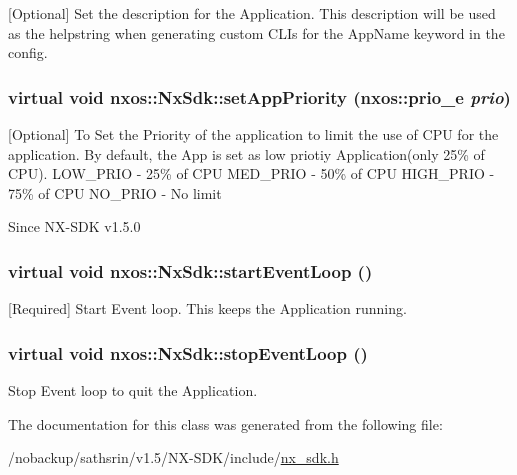 \label{classnxos_1_1NxSdk_a2c6007a383114285951b2d2a062dacec}
\mbox{[}Optional\mbox{]} Set the description for the Application. This description will be used as the helpstring when generating custom CLIs for the AppName keyword in the config. \hypertarget{classnxos_1_1NxSdk_a46d9487216506aa19e5499759f5eaef7}{
\subsubsection[{setAppPriority}]{\setlength{\rightskip}{0pt plus 5cm}virtual void nxos::NxSdk::setAppPriority (nxos::prio\_\-e {\em prio})}}
\label{classnxos_1_1NxSdk_a46d9487216506aa19e5499759f5eaef7}
\mbox{[}Optional\mbox{]} To Set the Priority of the application to limit the use of CPU for the application. By default, the App is set as low priotiy Application(only 25\% of CPU). LOW\_\-PRIO -\/ 25\% of CPU MED\_\-PRIO -\/ 50\% of CPU HIGH\_\-PRIO -\/ 75\% of CPU NO\_\-PRIO -\/ No limit

\begin{DoxySince}{Since}
NX-\/SDK v1.5.0 
\end{DoxySince}
\hypertarget{classnxos_1_1NxSdk_a75ca70643fe325ddf0eea62c1f8c4cc8}{
\subsubsection[{startEventLoop}]{\setlength{\rightskip}{0pt plus 5cm}virtual void nxos::NxSdk::startEventLoop ()}}
\label{classnxos_1_1NxSdk_a75ca70643fe325ddf0eea62c1f8c4cc8}
\mbox{[}Required\mbox{]} Start Event loop. This keeps the Application running. \hypertarget{classnxos_1_1NxSdk_adc80e6f244a7cbc050f9dacbc8018315}{
\subsubsection[{stopEventLoop}]{\setlength{\rightskip}{0pt plus 5cm}virtual void nxos::NxSdk::stopEventLoop ()}}
\label{classnxos_1_1NxSdk_adc80e6f244a7cbc050f9dacbc8018315}
Stop Event loop to quit the Application. 

The documentation for this class was generated from the following file:\begin{DoxyCompactItemize}
\item 
/nobackup/sathsrin/v1.5/NX-\/SDK/include/\hyperlink{nx__sdk_8h}{nx\_\-sdk.h}\end{DoxyCompactItemize}
